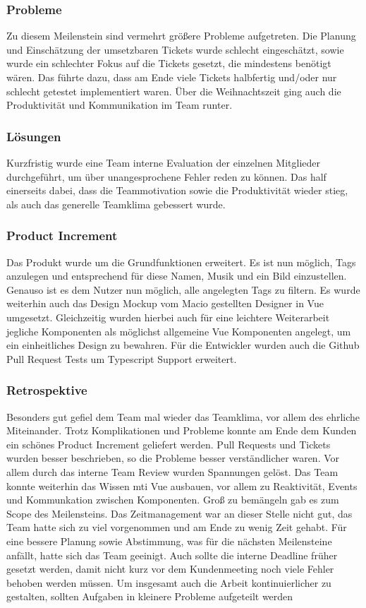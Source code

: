 \documentclass[10pt, a4paper, draft]{article}
\begin{document}
\subsubsection{Probleme}
Zu diesem Meilenstein sind vermehrt größere Probleme aufgetreten.
Die Planung und Einschätzung der umsetzbaren Tickets wurde schlecht eingeschätzt, sowie wurde ein schlechter Fokus auf die Tickets gesetzt, die mindestens benötigt wären.
Das führte dazu, dass am Ende viele Tickets halbfertig und/oder nur schlecht getestet implementiert waren.
Über die Weihnachtszeit ging auch die Produktivität und Kommunikation im Team runter.
\subsubsection{Lösungen}
Kurzfristig wurde eine Team interne Evaluation der einzelnen Mitglieder durchgeführt, um über unangesprochene Fehler reden zu können.
Das half einerseits dabei, dass die Teammotivation sowie die Produktivität wieder stieg, als auch das generelle Teamklima gebessert wurde.
\subsubsection{Product Increment}
Das Produkt wurde um die Grundfunktionen erweitert.
Es ist nun möglich, Tags anzulegen und entsprechend für diese Namen, Musik und ein Bild einzustellen.
Genauso ist es dem Nutzer nun möglich, alle angelegten Tags zu filtern.
Es wurde weiterhin auch das Design Mockup vom Macio gestellten Designer in Vue umgesetzt.
Gleichzeitig wurden hierbei auch für eine leichtere Weiterarbeit jegliche Komponenten als möglichst allgemeine Vue Komponenten angelegt, um ein einheitliches Design zu bewahren.
Für die Entwickler wurden auch die Github Pull Request Tests um Typescript Support erweitert.
\subsubsection{Retrospektive}
Besonders gut gefiel dem Team mal wieder das Teamklima, vor allem des ehrliche Miteinander.
Trotz Komplikationen und Probleme konnte am Ende dem Kunden ein schönes Product Increment geliefert werden.
Pull Requests und Tickets wurden besser beschrieben, so die Probleme besser verständlicher waren.
Vor allem durch das interne Team Review wurden Spannungen gelöst.
Das Team konnte weiterhin das Wissen mti Vue ausbauen, vor allem zu Reaktivität, Events und Kommunkation zwischen Komponenten.
Groß zu bemängeln gab es zum Scope des Meilensteins.
Das Zeitmanagement war an dieser Stelle nicht gut, das Team hatte sich zu viel vorgenommen und am Ende zu wenig Zeit gehabt.
Für eine bessere Planung sowie Abstimmung, was für die nächsten Meilensteine anfällt, hatte sich das Team geeinigt.
Auch sollte die interne Deadline früher gesetzt werden, damit nicht kurz vor dem Kundenmeeting noch viele Fehler behoben werden müssen.
Um insgesamt auch die Arbeit kontinuierlicher zu gestalten, sollten Aufgaben in kleinere Probleme aufgeteilt werden
\end{document}

